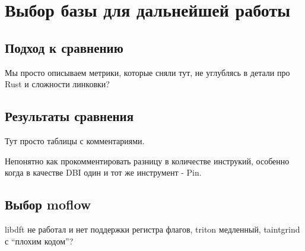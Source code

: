 \chapter{Выбор базы для дальнейшей работы}

\section{Подход к сравнению}

Мы просто описываем метрики, которые сняли тут, не углублясь в детали про Rust и сложности линковки?

\section{Результаты сравнения}

Тут просто таблицы с комментариями.

Непонятно как прокомментировать разницу в количестве инструкий, особенно когда в качестве DBI один и тот же инструмент - Pin.

\section{Выбор moflow}

libdft не работал и нет поддержки регистра флагов, triton медленный, taintgrind с ``плохим кодом''?